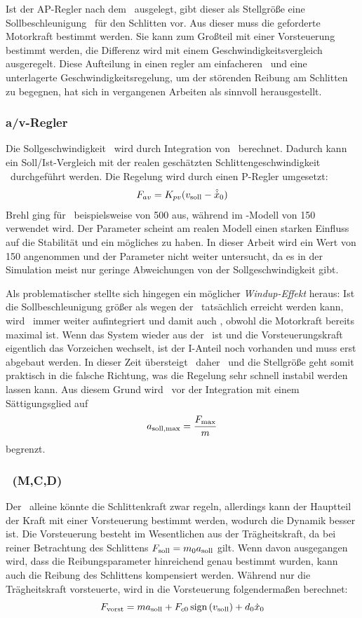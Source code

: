 Ist der AP-Regler nach dem \bss\ ausgelegt, gibt dieser als Stellgröße eine Sollbeschleunigung \asoll\ für den Schlitten vor. 
Aus dieser muss die geforderte Motorkraft bestimmt werden.
Sie kann zum Großteil mit einer Vorsteuerung bestimmt werden, die Differenz wird mit einem Geschwindigkeitsvergleich ausgeregelt.
Diese Aufteilung in einen \ap regler am einfacheren \bss\ und eine unterlagerte Geschwindigkeitsregelung, um der störenden Reibung am Schlitten zu begegnen, hat sich in vergangenen Arbeiten als sinnvoll herausgestellt.

\subsubsection{a/v-Regler}
Die Sollgeschwindigkeit \vsoll\ wird durch Integration von \asoll\ berechnet.
Dadurch kann ein Soll/Ist-Vergleich mit der realen \bzw geschätzten Schlittengeschwindigkeit \xop\ durchgeführt werden.
Die Regelung wird durch einen P-Regler umgesetzt:
	\[
	F_{av}= K_{pv} (v_{\mathrm{soll}}-\hat{\dot{x}}_0)
\]
Brehl \cite{brehl} ging für \kpv\ beispielsweise von 500 aus, während im \sm-Modell von \cite{chang} 150 verwendet wird.
Der Parameter scheint am realen Modell einen starken Einfluss auf die Stabilität und ein mögliches  zu haben.
In dieser Arbeit wird ein Wert von 150 angenommen und der Parameter nicht weiter untersucht, da es in der Simulation meist nur geringe Abweichungen von der Sollgeschwindigkeit gibt.

Als problematischer stellte sich hingegen ein möglicher \emph{Windup-Effekt} heraus: 
Ist die Sollbeschleunigung größer als wegen der \sgb\ tatsächlich erreicht werden kann, wird \vsoll\ immer weiter aufintegriert und damit auch \fav, obwohl die Motorkraft bereits maximal ist. 
Wenn das System wieder aus der \sgb\ ist und die Vorsteuerungskraft eigentlich das Vorzeichen wechselt, ist der I-Anteil noch vorhanden und muss erst abgebaut werden.
In dieser Zeit übersteigt \fav\ daher \fvorst\ und die Stellgröße geht somit praktisch in die falsche Richtung, was die Regelung sehr schnell instabil werden lassen kann.
Aus diesem Grund wird \asoll\ vor der Integration mit einem Sättigungsglied auf 
	\[
	a_{\mathrm{soll,max}}=\frac{F_{\mathrm{max}}}{m}
\] 
begrenzt.

\subsubsection{\vorst\  (M,C,D)}
Der \avr\ alleine könnte die Schlittenkraft zwar regeln, allerdings kann der Hauptteil der Kraft mit einer Vorsteuerung bestimmt werden, wodurch die Dynamik besser ist.
Die Vorsteuerung besteht im Wesentlichen aus der Trägheitskraft, da bei reiner Betrachtung des Schlittens $F_{\mathrm{soll}}=m_0 a_{\mathrm{soll}}$ gilt. 
Wenn davon ausgegangen wird, dass die Reibungsparameter hinreichend genau bestimmt wurden, kann auch die Reibung des Schlittens kompensiert werden.
Während \cite{brehl} nur die Trägheitskraft vorsteuerte, wird in \cite{chang} die Vorsteuerung folgendermaßen berechnet:
	\[
	F_{\mathrm{vorst}}=m a_{\mathrm{soll}} + F_{c0} \, \mathrm{sign}\left(v_{\mathrm{soll}}\right) + d_0 \dot{x}_0
\]

